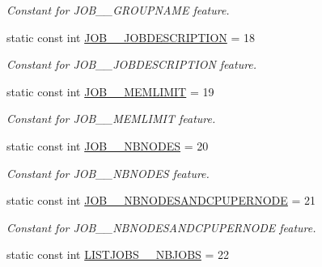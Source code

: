 \begin{DoxyCompactItemize}
\begin{DoxyCompactList}\small\item\em Constant for JOB\_\-\_\-GROUPNAME feature. \item\end{DoxyCompactList}\item 
\hypertarget{classTMS__Data_1_1TMS__DataPackage_ab1605705b357f5157bd8d647cc69b4ad}{
static const int \hyperlink{classTMS__Data_1_1TMS__DataPackage_ab1605705b357f5157bd8d647cc69b4ad}{JOB\_\-\_\-JOBDESCRIPTION} = 18}
\label{classTMS__Data_1_1TMS__DataPackage_ab1605705b357f5157bd8d647cc69b4ad}

\begin{DoxyCompactList}\small\item\em Constant for JOB\_\-\_\-JOBDESCRIPTION feature. \item\end{DoxyCompactList}\item 
\hypertarget{classTMS__Data_1_1TMS__DataPackage_a7143a8445b1ca2d3b84be5b84a7ab50b}{
static const int \hyperlink{classTMS__Data_1_1TMS__DataPackage_a7143a8445b1ca2d3b84be5b84a7ab50b}{JOB\_\-\_\-MEMLIMIT} = 19}
\label{classTMS__Data_1_1TMS__DataPackage_a7143a8445b1ca2d3b84be5b84a7ab50b}

\begin{DoxyCompactList}\small\item\em Constant for JOB\_\-\_\-MEMLIMIT feature. \item\end{DoxyCompactList}\item 
\hypertarget{classTMS__Data_1_1TMS__DataPackage_a79faf9c975804b36e0e6cf1a3be7b076}{
static const int \hyperlink{classTMS__Data_1_1TMS__DataPackage_a79faf9c975804b36e0e6cf1a3be7b076}{JOB\_\-\_\-NBNODES} = 20}
\label{classTMS__Data_1_1TMS__DataPackage_a79faf9c975804b36e0e6cf1a3be7b076}

\begin{DoxyCompactList}\small\item\em Constant for JOB\_\-\_\-NBNODES feature. \item\end{DoxyCompactList}\item 
\hypertarget{classTMS__Data_1_1TMS__DataPackage_a3a29245f4f7b482430694e0cee9d01e5}{
static const int \hyperlink{classTMS__Data_1_1TMS__DataPackage_a3a29245f4f7b482430694e0cee9d01e5}{JOB\_\-\_\-NBNODESANDCPUPERNODE} = 21}
\label{classTMS__Data_1_1TMS__DataPackage_a3a29245f4f7b482430694e0cee9d01e5}

\begin{DoxyCompactList}\small\item\em Constant for JOB\_\-\_\-NBNODESANDCPUPERNODE feature. \item\end{DoxyCompactList}\item 
\hypertarget{classTMS__Data_1_1TMS__DataPackage_a35f86d84c2c3f47dd8c1b8315508cb36}{
static const int \hyperlink{classTMS__Data_1_1TMS__DataPackage_a35f86d84c2c3f47dd8c1b8315508cb36}{LISTJOBS\_\-\_\-NBJOBS} = 22}
\label{classTMS__Data_1_1TMS__DataPackage_a35f86d84c2c3f47dd8c1b8315508cb36}


\end{DoxyCompactItemize}

